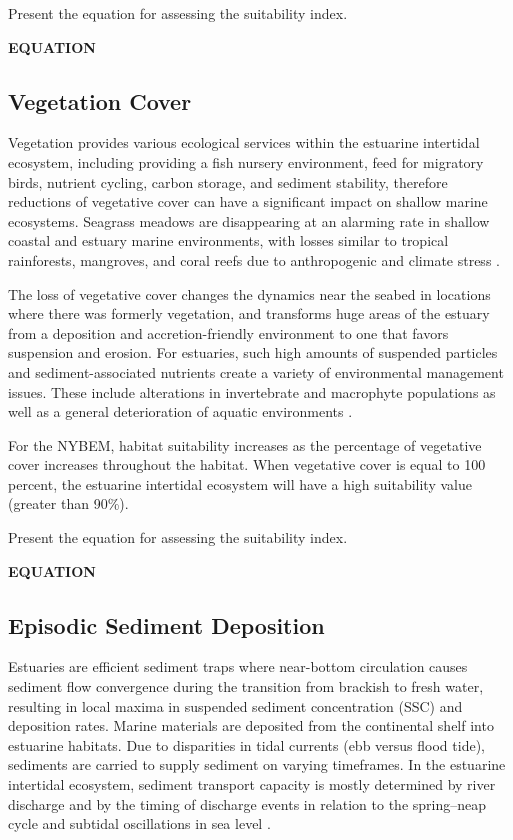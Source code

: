 \documentclass[
]{book}
\begin{document}
Present the equation for assessing the suitability index.

\textbf{EQUATION}

\hypertarget{vegetation-cover}{%
\subsection{Vegetation Cover}\label{vegetation-cover}}

Vegetation provides various ecological services within the estuarine intertidal ecosystem, including providing a fish nursery environment, feed for migratory birds, nutrient cycling, carbon storage, and sediment stability, therefore reductions of vegetative cover can have a significant impact on shallow marine ecosystems. Seagrass meadows are disappearing at an alarming rate in shallow coastal and estuary marine environments, with losses similar to tropical rainforests, mangroves, and coral reefs due to anthropogenic and climate stress \citep{walter_large-scale_2020}.

The loss of vegetative cover changes the dynamics near the seabed in locations where there was formerly vegetation, and transforms huge areas of the estuary from a deposition and accretion-friendly environment to one that favors suspension and erosion. For estuaries, such high amounts of suspended particles and sediment-associated nutrients create a variety of environmental management issues. These include alterations in invertebrate and macrophyte populations as well as a general deterioration of aquatic environments \citep{cotton_effects_2006}.

For the NYBEM, habitat suitability increases as the percentage of vegetative cover increases throughout the habitat. When vegetative cover is equal to 100 percent, the estuarine intertidal ecosystem will have a high suitability value (greater than 90\%).

Present the equation for assessing the suitability index.

\textbf{EQUATION}

\hypertarget{episodic-sediment-deposition}{%
\subsection{Episodic Sediment Deposition}\label{episodic-sediment-deposition}}

Estuaries are efficient sediment traps where near-bottom circulation causes sediment flow convergence during the transition from brackish to fresh water, resulting in local maxima in suspended sediment concentration (SSC) and deposition rates. Marine materials are deposited from the continental shelf into estuarine habitats. Due to disparities in tidal currents (ebb versus flood tide), sediments are carried to supply sediment on varying timeframes. In the estuarine intertidal ecosystem, sediment transport capacity is mostly determined by river discharge and by the timing of discharge events in relation to the spring--neap cycle and subtidal oscillations in sea level \citep{prosser_impacts_2018}.
\end{document}
